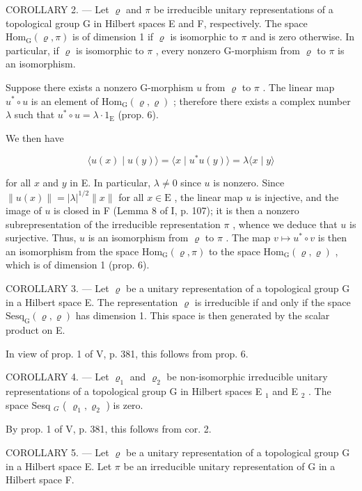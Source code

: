 COROLLARY 2. --- Let \(\varrho\) and \(\pi\) be irreducible unitary representations of a topological group G in Hilbert spaces E and F, respectively. The space \(\mathrm{Hom}_{\mathrm{G}}(\varrho, \pi)\) is of dimension 1 if \(\varrho\) is isomorphic to \(\pi\) and is zero otherwise. In particular, if \(\varrho\) is isomorphic to \(\pi\) , every nonzero G-morphism from \(\varrho\) to \(\pi\) is an isomorphism.

Suppose there exists a nonzero G-morphism \(u\) from \(\varrho\) to \(\pi\) . The linear map \(u^{*} \circ u\) is an element of \(\mathrm{Hom}_{\mathrm{G}}(\varrho, \varrho)\) ; therefore there exists a complex number \(\lambda\) such that \(u^{*} \circ u = \lambda \cdot 1_{\mathrm{E}}\) (prop. 6).

We then have

\[
\langle u (x) \mid u (y) \rangle = \langle x \mid u ^ {*} u (y) \rangle = \lambda \langle x \mid y \rangle
\]

for all \(x\) and \(y\) in E. In particular, \(\lambda \neq 0\) since \(u\) is nonzero. Since \(\| u(x)\| = |\lambda |^{1 / 2}\| x\|\) for all \(x\in \mathrm{E}\) , the linear map \(u\) is injective, and the image of \(u\) is closed in F (Lemma 8 of I, p. 107); it is then a nonzero subrepresentation of the irreducible representation \(\pi\) , whence we deduce that \(u\) is surjective. Thus, \(u\) is an isomorphism from \(\varrho\) to \(\pi\) . The map \(v\mapsto u^{*}\circ v\) is then an isomorphism from the space \(\mathrm{Hom}_{\mathrm{G}}(\varrho ,\pi)\) to the space \(\mathrm{Hom}_{\mathrm{G}}(\varrho ,\varrho)\) , which is of dimension 1 (prop. 6).

COROLLARY 3. --- Let \(\varrho\) be a unitary representation of a topological group G in a Hilbert space E. The representation \(\varrho\) is irreducible if and only if the space \(\mathrm{Sesq}_{\mathrm{G}}(\varrho, \varrho)\) has dimension 1. This space is then generated by the scalar product on E.

In view of prop. 1 of V, p. 381, this follows from prop. 6.

COROLLARY 4. --- Let \(\varrho_{1}\) and \(\varrho_{2}\) be non-isomorphic irreducible unitary representations of a topological group G in Hilbert spaces E \(_{1}\) and E \(_{2}\) . The space Sesq \(_{G}\) ( \(\varrho_{1}, \varrho_{2}\) ) is zero.

By prop. 1 of V, p. 381, this follows from cor. 2.

COROLLARY 5. --- Let \(\varrho\) be a unitary representation of a topological group G in a Hilbert space E. Let \(\pi\) be an irreducible unitary representation of G in a Hilbert space F.

